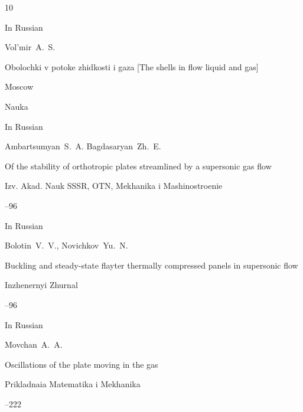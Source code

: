 \begin{thebibliography}{10}




\lang In Russian

\by Vol'mir~A.~S.

\book Obolochki v potoke zhidkosti i gaza \rm [The shells in flow liquid and gas] 

\publaddr Moscow

\publ Nauka






\lang In Russian

\by Ambartsumyan~S.~A. Bagdasaryan~Zh.~E.

\paper Of the stability of orthotropic plates streamlined by a supersonic gas flow

\jour Izv. Akad. Nauk SSSR, OTN, Mekhanika i Mashinostroenie



--96




\lang In Russian

\by Bolotin~V.~V., Novichkov~Yu.~N. 

\paper Buckling and steady-state flayter thermally compressed panels in supersonic flow

\jour Inzhenernyi Zhurnal 



--96








\lang In Russian

\by Movchan~A.~A. 

\paper Oscillations of the plate moving in the gas

\jour Prikladnaia Matematika i Mekhanika




--222






\end{thebibliography}
